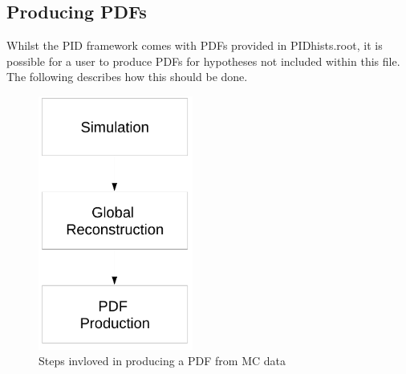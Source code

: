 \documentclass[a4paper,12pt]{article}
\begin{document}
\subsection{Producing PDFs}
\label{PDFs}
Whilst the PID framework comes with PDFs provided in PIDhists.root, it is possible for a user to produce PDFs for hypotheses not included within this file. The following describes how this should be done.
\begin{figure}[h!]
\begin{center} 
\includegraphics[width=2in]{pdfprodflow.pdf} 
\caption{Steps invloved in producing a PDF from MC data}
\label{pdfprod}
\end{center} 
\end{figure}
\end{document}

